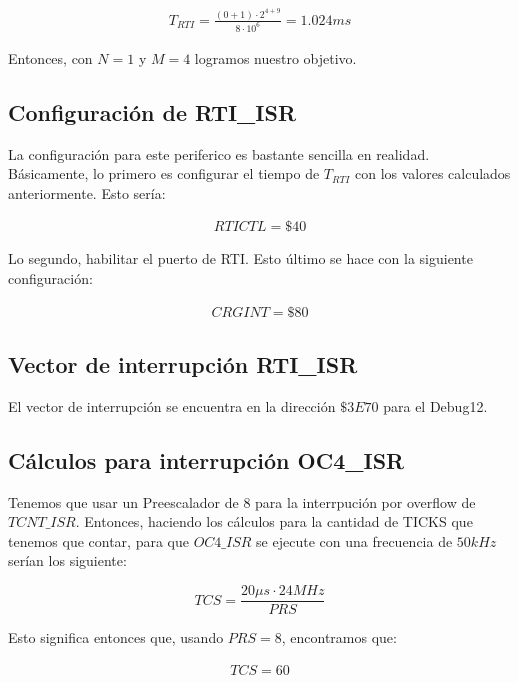 \documentclass[12pt,letterpaper]{report} %
\begin{document}
\begin{align*}
    T_{RTI} = \frac{(0+1)\cdot2^{4+9}}{8\cdot10^6} = 1.024ms
\end{align*}

Entonces, con $N=1$ y $M=4$ logramos nuestro objetivo.

\subsection{Configuración de RTI\_ISR}

La configuración para este periferico es bastante sencilla en realidad. Básicamente, lo primero es configurar el tiempo de $T_{RTI}$ con los valores calculados anteriormente. Esto sería:

\begin{align*}
    RTICTL = \$40
\end{align*}

Lo segundo, habilitar el puerto de RTI. Esto último se hace con la siguiente configuración:

\begin{align*}
    CRGINT = \$80
\end{align*}

\subsection{Vector de interrupción RTI\_ISR}

El vector de interrupción se encuentra en la dirección $\$3E70$ para el Debug12.

\subsection{Cálculos para interrupción OC4\_ISR}

Tenemos que usar un Preescalador de 8 para la interrpución por overflow de $TCNT\_ISR$. Entonces, haciendo los cálculos para la cantidad de TICKS que tenemos que contar, para que $OC4\_ISR$ se ejecute con una frecuencia de $50kHz$ serían los siguiente: 

\begin{equation}
    TCS = \frac{20\mu s \cdot 24 MHz}{PRS}
\end{equation}

Esto significa entonces que, usando $PRS = 8$, encontramos que:

\begin{align*}
    TCS = 60
\end{align*}
\end{document}
